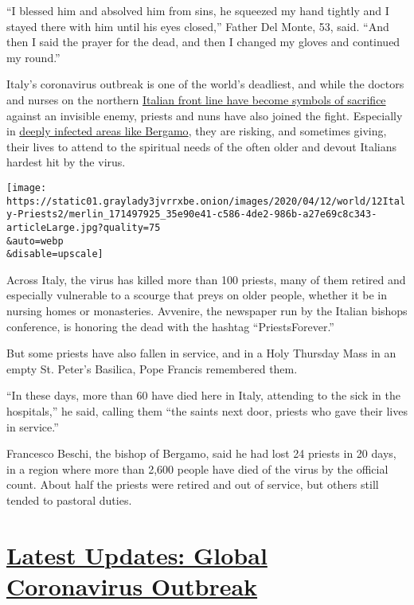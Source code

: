 ``I blessed him and absolved him from sins, he squeezed my hand tightly
and I stayed there with him until his eyes closed,'' Father Del Monte,
53, said. ``And then I said the prayer for the dead, and then I changed
my gloves and continued my round.''

Italy's coronavirus outbreak is one of the world's deadliest, and while
the doctors and nurses on the northern
\href{https://www.nytimes3xbfgragh.onion/interactive/2020/04/07/magazine/italy-hospitals-covid.html}{Italian
front line have become symbols of sacrifice} against an invisible enemy,
priests and nuns have also joined the fight. Especially in
\href{https://www.nytimes3xbfgragh.onion/interactive/2020/03/27/world/europe/coronavirus-italy-bergamo.html}{deeply
infected areas like Bergamo}, they are risking, and sometimes giving,
their lives to attend to the spiritual needs of the often older and
devout Italians hardest hit by the virus.

\texttt{[image: https://static01.graylady3jvrrxbe.onion/images/2020/04/12/world/12Italy-Priests2/merlin\_171497925\_35e90e41-c586-4de2-986b-a27e69c8c343-articleLarge.jpg?quality=75\\\&auto=webp\\\&disable=upscale]}

Across Italy, the virus has killed more than 100 priests, many of them
retired and especially vulnerable to a scourge that preys on older
people, whether it be in nursing homes or monasteries. Avvenire, the
newspaper run by the Italian bishops conference, is honoring the dead
with the hashtag ``PriestsForever.''

But some priests have also fallen in service, and in a Holy Thursday
Mass in an empty St. Peter's Basilica, Pope Francis remembered them.

``In these days, more than 60 have died here in Italy, attending to the
sick in the hospitals,'' he said, calling them ``the saints next door,
priests who gave their lives in service.''

Francesco Beschi, the bishop of Bergamo, said he had lost 24 priests in
20 days, in a region where more than 2,600 people have died of the virus
by the official count. About half the priests were retired and out of
service, but others still tended to pastoral duties.

\hypertarget{latest-updates-global-coronavirus-outbreak}{%
\section{\texorpdfstring{\href{https://www.nytimes3xbfgragh.onion/2020/08/01/world/coronavirus-covid-19.html?action=click\&pgtype=Article\&state=default\&region=MAIN_CONTENT_1\&context=storylines_live_updates}{Latest
Updates: Global Coronavirus
Outbreak}}{Latest Updates: Global Coronavirus Outbreak}}\label{latest-updates-global-coronavirus-outbreak}}

